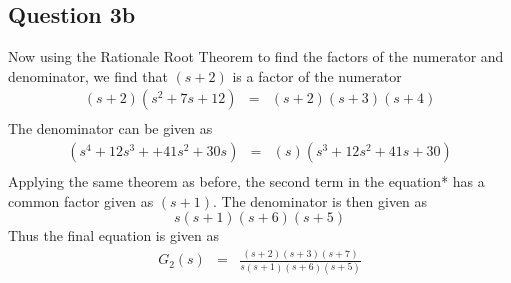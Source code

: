 \documentclass[12pt, a4paper]{article}
\begin{document}
		\subsection*{Question 3b}
		\label{sub:question_3b}
			Now using the Rationale Root Theorem to find the factors of the numerator and denominator, we find that $(s+2)$ is a factor of the numerator
			\begin{equation*}
				\begin{array}{rcl}
				(s+2)(s^2+7s+12) & = & (s+2)(s+3)(s+4) \\
				\end{array}
			\end{equation*}
			The denominator can be given as
			\begin{equation*}
				\begin{array}{rcl}
				(s^4+12s^3++41s^2+30s) & = & (s)(s^3+12s^2+41s+30) \\
				\end{array}
			\end{equation*}
			Applying the same theorem as before, the second term in the equation* has a common factor given as $(s+1)$. The denominator is then given as 
			\begin{equation*}
					s(s+1)(s+6)(s+5)
			\end{equation*}
			Thus the final equation is given as 
			\begin{equation*}
				\begin{array}{rcl}
				G_2(s) & = & \frac{(s+2)(s+3)(s+7)}{s(s+1)(s+6)(s+5)}
				\end{array}
			\end{equation*}
\end{document}
